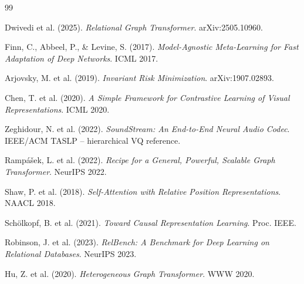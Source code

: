\documentclass[12pt,a4paper]{article}
\begin{document}
\begin{thebibliography}{99}

Dwivedi et al. (2025). \textit{Relational Graph Transformer}. arXiv:2505.10960.

Finn, C., Abbeel, P., \& Levine, S. (2017). \textit{Model-Agnostic Meta-Learning
for Fast Adaptation of Deep Networks}. ICML 2017.

Arjovsky, M. et al. (2019). \textit{Invariant Risk Minimization}. arXiv:1907.02893.

Chen, T. et al. (2020). \textit{A Simple Framework for Contrastive Learning of
Visual Representations}. ICML 2020.

Zeghidour, N. et al. (2022). \textit{SoundStream: An End-to-End Neural Audio
Codec}. IEEE/ACM TASLP -- hierarchical VQ reference.

Rampášek, L. et al. (2022). \textit{Recipe for a General, Powerful, Scalable
Graph Transformer}. NeurIPS 2022.

Shaw, P. et al. (2018). \textit{Self-Attention with Relative Position
Representations}. NAACL 2018.

Schölkopf, B. et al. (2021). \textit{Toward Causal Representation Learning}.
Proc. IEEE.

Robinson, J. et al. (2023). \textit{RelBench: A Benchmark for Deep Learning
on Relational Databases}. NeurIPS 2023.

Hu, Z. et al. (2020). \textit{Heterogeneous Graph Transformer}. WWW 2020.

\end{thebibliography}
\end{document}
